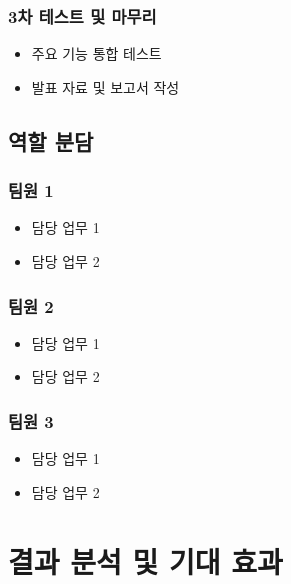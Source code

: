 \documentclass[12pt,a4paper,oneside]{report}
\begin{document}
\subsection{3차 테스트 및 마무리}
\begin{itemize}[leftmargin=1.5em,label={-},itemsep=2pt,topsep=4pt]
  \item 주요 기능 통합 테스트
  \item 발표 자료 및 보고서 작성
\end{itemize}

\section{역할 분담}

\subsection{팀원 1}
\begin{itemize}[leftmargin=1.5em,label={-},itemsep=2pt,topsep=4pt]
  \item 담당 업무 1
  \item 담당 업무 2
\end{itemize}

\subsection{팀원 2}
\begin{itemize}[leftmargin=1.5em,label={-},itemsep=2pt,topsep=4pt]
  \item 담당 업무 1
  \item 담당 업무 2
\end{itemize}

\subsection{팀원 3}
\begin{itemize}[leftmargin=1.5em,label={-},itemsep=2pt,topsep=4pt]
  \item 담당 업무 1
  \item 담당 업무 2
\end{itemize}

\chapter{결과 분석 및 기대 효과}
\end{document}
